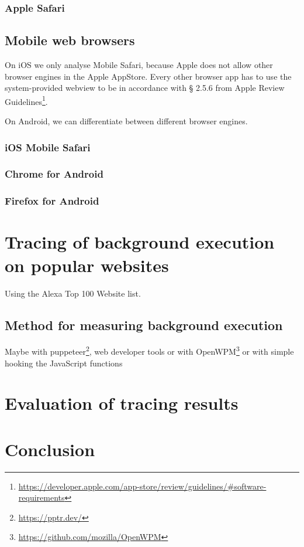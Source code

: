 \documentclass[article,type=bsc,colorback,accentcolor=tud9c]{tudthesis}
\begin{document}
  \subsubsection{Apple Safari}

  \subsection{Mobile web browsers}

  On iOS we only analyse Mobile Safari, because Apple does not allow other browser engines in the Apple AppStore. Every other browser app has to use the system-provided webview to be in accordance with § 2.5.6 from Apple Review Guidelines\footnote{\url{https://developer.apple.com/app-store/review/guidelines/\#software-requirements}}.

  On Android, we can differentiate between different browser engines.

  \subsubsection{iOS Mobile Safari}

  \subsubsection{Chrome for Android}

  \subsubsection{Firefox for Android}

  \newpage
  \section{Tracing of background execution on popular websites}

  Using the Alexa Top 100 Website list.
  
  \subsection{Method for measuring background execution}

  Maybe with puppeteer\footnote{\url{https://pptr.dev/}}, web developer tools or with OpenWPM\footnote{\url{https://github.com/mozilla/OpenWPM}} or with simple hooking the JavaScript functions



  
  \newpage
  \section{Evaluation of tracing results}

  
  \newpage
  \section{Conclusion}

  

  

   
\end{document}
